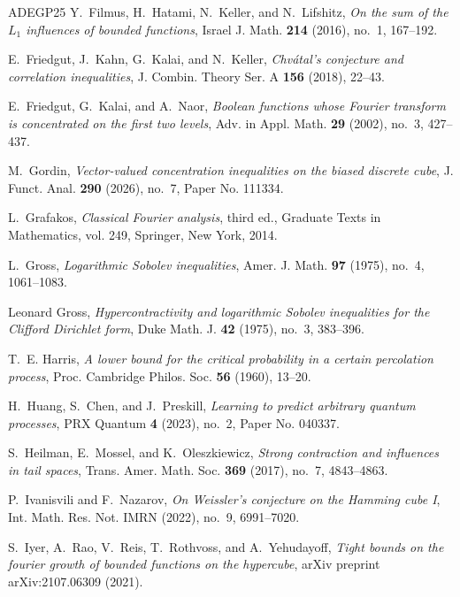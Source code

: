\documentclass{amsbook}
\theoremstyle{definition}
\theoremstyle{remark}
\numberwithin{section}{chapter}
\numberwithin{equation}{chapter}
\newcommand{\1}{\mathbf{1}}
\begin{document}
\begin{thebibliography}{ADEGP25}
	Y.~Filmus, H.~Hatami, N.~Keller, and N.~Lifshitz, \emph{On the sum of the
		{$L_1$} influences of bounded functions}, Israel J. Math. \textbf{214}
	(2016), no.~1, 167--192. 
	
	E.~Friedgut, J.~Kahn, G.~Kalai, and N.~Keller, \emph{Chv\'{a}tal's conjecture
		and correlation inequalities}, J. Combin. Theory Ser. A \textbf{156} (2018),
	22--43. 
	
	E.~Friedgut, G.~Kalai, and A.~Naor, \emph{Boolean functions whose {F}ourier
		transform is concentrated on the first two levels}, Adv. in Appl. Math.
	\textbf{29} (2002), no.~3, 427--437. 
	
	M.~Gordin, \emph{Vector-valued concentration inequalities on the biased
		discrete cube}, J. Funct. Anal. \textbf{290} (2026), no.~7, Paper No. 111334.
	
	L.~Grafakos, \emph{Classical {F}ourier analysis}, third ed., Graduate Texts in
	Mathematics, vol. 249, Springer, New York, 2014. 
	
	L.~Gross, \emph{Logarithmic {S}obolev inequalities}, Amer. J. Math. \textbf{97}
	(1975), no.~4, 1061--1083.
	
	Leonard Gross, \emph{Hypercontractivity and logarithmic {S}obolev inequalities
		for the {C}lifford {D}irichlet form}, Duke Math. J. \textbf{42} (1975),
	no.~3, 383--396. 
	
	T.~E. Harris, \emph{A lower bound for the critical probability in a certain
		percolation process}, Proc. Cambridge Philos. Soc. \textbf{56} (1960),
	13--20. 
	
	H.~Huang, S.~Chen, and J.~Preskill, \emph{Learning to predict arbitrary quantum
		processes}, PRX Quantum \textbf{4} (2023), no.~2, Paper No. 040337.
	
	S.~Heilman, E.~Mossel, and K.~Oleszkiewicz, \emph{Strong contraction and
		influences in tail spaces}, Trans. Amer. Math. Soc. \textbf{369} (2017),
	no.~7, 4843--4863. 
	
	P.~Ivanisvili and F.~Nazarov, \emph{On {W}eissler's conjecture on the {H}amming
		cube {I}}, Int. Math. Res. Not. IMRN (2022), no.~9, 6991--7020. 
	
	S.~Iyer, A.~Rao, V.~Reis, T.~Rothvoss, and A.~Yehudayoff, \emph{Tight bounds on
		the fourier growth of bounded functions on the hypercube}, arXiv preprint
	arXiv:2107.06309 (2021).
	

\end{thebibliography}
\end{document}
